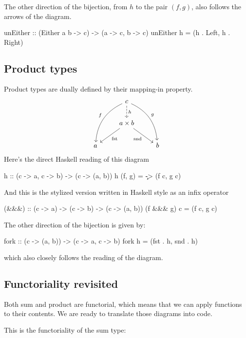 \documentclass[DaoFP]{subfiles}
\begin{document}
The other direction of the bijection, from $h$ to the pair $(f, g)$, also follows the arrows of the diagram.
\begin{haskell}
unEither :: (Either a b -> c) -> (a -> c, b -> c)
unEither h = (h . Left, h . Right)
\end{haskell}


\subsection{Product types}

Product types are dually defined by their mapping-in property.
\[
 \begin{tikzcd}
 & c
\arrow[d, dashed, "h"]
 \arrow[ddl, bend right, "f"']
 \arrow[ddr, bend left, "g"]
\\
&a \times b
 \arrow[dl,  "\text{fst}"]
  \arrow[dr,   "\text{snd}"']
\\
a && b
 \end{tikzcd}
\]
Here's the direct Haskell reading of this diagram
\begin{haskell}
h :: (c -> a, c -> b) -> (c -> (a, b))
h (f, g) = \c -> (f c, g c)
\end{haskell}
And this is the stylized version written in Haskell style as an infix operator \hask{&&&}
\begin{haskell}
(&&&) :: (c -> a) -> (c -> b) -> (c -> (a, b))
(f &&& g) c = (f c, g c)
\end{haskell}
The other direction of the bijection is given by:
\begin{haskell}
fork :: (c -> (a, b)) -> (c -> a, c -> b)
fork h = (fst . h, snd . h)
\end{haskell}
which also closely follows the reading of the diagram.

\subsection{Functoriality revisited}

Both sum and product are functorial, which means that we can apply functions to their contents. We are ready to translate those diagrams into code. 

This is the functoriality of the sum type:
\end{document}
